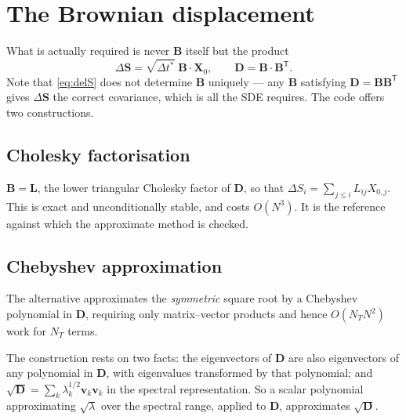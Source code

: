 \documentclass[11pt,a4paper]{report}
\newcommand{\D}{\bm{D}}
\newcommand{\B}{\bm{B}}
\newcommand{\dt}{\Delta t^{*}}
\begin{document}
\section{The Brownian displacement}
\label{sec:brownian-step}

What is actually required is never $\B$ itself but the product
\begin{equation}
  \Delta\bm{S} = \sqrt{\dt}\;\B\cdot\bm{X}_0,
  \qquad \D = \B\cdot\B^{\mathsf{T}} .
  \label{eq:delS}
\end{equation}
Note that \eqref{eq:delS} does not determine $\B$ uniquely --- any $\B$
satisfying $\D = \B\B^{\mathsf{T}}$ gives $\Delta\bm{S}$ the correct covariance,
which is all the SDE requires. The code offers two constructions.

\subsection{Cholesky factorisation}

$\B = \bm{L}$, the lower triangular Cholesky factor of $\D$, so that
$\Delta S_i = \sum_{j\le i} L_{ij} X_{0,j}$. This is exact and unconditionally
stable, and costs $O(N^3)$. It is the reference against which the approximate
method is checked.

\subsection{Chebyshev approximation}

The alternative approximates the \emph{symmetric} square root by a Chebyshev
polynomial in $\D$, requiring only matrix--vector products and hence
$O(N_T N^2)$ work for $N_T$ terms.

The construction rests on two facts: the eigenvectors of $\D$ are also
eigenvectors of any polynomial in $\D$, with eigenvalues transformed by that
polynomial; and $\sqrt{\D} = \sum_k \lambda_k^{1/2}\bm{v}_k\bm{v}_k$ in the
spectral representation. So a scalar polynomial approximating $\sqrt{\lambda}$
over the spectral range, applied to $\D$, approximates $\sqrt{\D}$.
\end{document}
